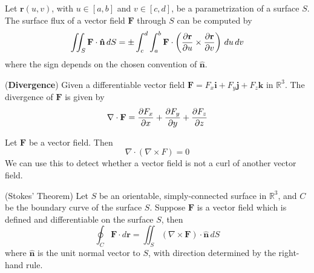 \documentclass{huhtakm-template-book}
\begin{document}
\begin{thm}
    Let $\mathbf{r}(u,v)$, with $u\in[a,b]$ and $v\in[c,d]$, be a parametrization of a surface $S$. The surface flux of a vector field $\mathbf{F}$ through $S$ can be computed by
    \begin{equation*}
        \iint_{S}\mathbf{F}\cdot\mathbf{\hat{n}}\,dS=\pm\int_{c}^{d}\int_{a}^{b}\mathbf{F}\cdot\left(\pdv{\mathbf{r}}{u}\times\pdv{\mathbf{r}}{v}\right)\,du\,dv
    \end{equation*}
    where the sign depends on the chosen convention of $\mathbf{\hat{n}}$.
\end{thm}
\begin{defn}(\textbf{Divergence})
    Given a differentiable vector field $\mathbf{F}=F_{x}\mathbf{i}+F_{y}\mathbf{j}+F_{z}\mathbf{k}$ in $\mathbb{R}^{3}$. The divergence of $\mathbf{F}$ is given by
    \begin{equation*}
        \nabla\cdot\mathbf{F}=\pdv{F_{x}}{x}+\pdv{F_{y}}{y}+\pdv{F_{z}}{z}
    \end{equation*}
\end{defn}
\begin{thm}
    Let $\mathbf{F}$ be a vector field. Then
    \begin{equation*}
        \nabla\cdot(\nabla\times F)=0
    \end{equation*}
    We can use this to detect whether a vector field is not a curl of another vector field.
\end{thm}
\begin{thm}(Stokes' Theorem)
    Let $S$ be an orientable, simply-connected surface in $\mathbb{R}^{3}$, and $C$ be the boundary curve of the surface $S$. Suppose $\mathbf{F}$ is a vector field which is defined and differentiable on the surface $S$, then
    \begin{equation*}
        \oint_{C}\mathbf{F}\cdot d\mathbf{r}=\iint_{S}(\nabla\times\mathbf{F})\cdot\mathbf{\hat{n}}\,dS
    \end{equation*}
    where $\mathbf{\hat{n}}$ is the unit normal vector to $S$, with direction determined by the right-hand rule.
\end{thm}
\end{document}
